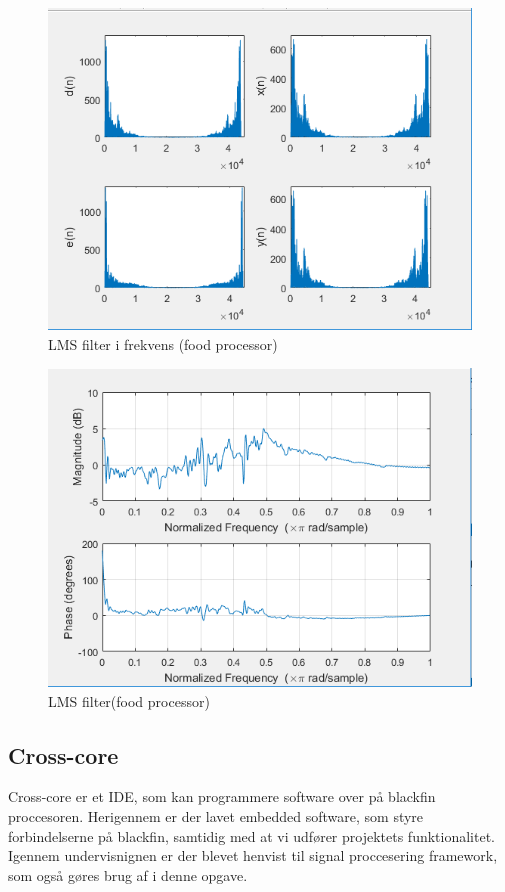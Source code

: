 \begin{figure}[H]
	\centering
	\includegraphics[width = 400pt]{Img/Filter_Freq_food}
	\caption{LMS filter i frekvens (food processor)}
	\label{fig:Filter_Freq_food}
\end{figure}
\newpage

\begin{figure}[H]
	\centering
	\includegraphics[width = 400pt]{Img/Filter_food}
	\caption{LMS filter(food processor)}
	\label{fig:Filter_food}
\end{figure}

\subsection{Cross-core}
Cross-core er et IDE, som kan programmere software over på blackfin proccesoren. Herigennem er der lavet embedded software, som styre forbindelserne på blackfin, samtidig med at vi udfører projektets funktionalitet. Igennem undervisnignen er der blevet henvist til signal proccesering framework, som også gøres brug af i denne opgave. 

